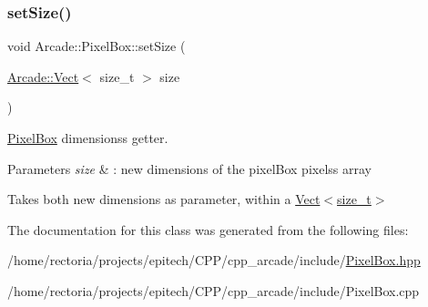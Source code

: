 \subsubsection{\texorpdfstring{set\+Size()}{setSize()}}
{\footnotesize\ttfamily void Arcade\+::\+Pixel\+Box\+::set\+Size (\begin{DoxyParamCaption}\item[{\hyperlink{class_arcade_1_1_vect}{Arcade\+::\+Vect}$<$ size\+\_\+t $>$}]{size }\end{DoxyParamCaption})}



\hyperlink{class_arcade_1_1_pixel_box}{Pixel\+Box} dimensions\textquotesingle{}s getter. 


\begin{DoxyParams}{Parameters}
{\em size} & \+: new dimensions of the pixel\+Box pixels\textquotesingle{}s array\\
\hline
\end{DoxyParams}
Takes both new dimensions as parameter, within a \hyperlink{class_arcade_1_1_vect}{Vect$<$size\+\_\+t$>$} 

The documentation for this class was generated from the following files\+:\begin{DoxyCompactItemize}
\item 
/home/rectoria/projects/epitech/\+C\+P\+P/cpp\+\_\+arcade/include/\hyperlink{_pixel_box_8hpp}{Pixel\+Box.\+hpp}\item 
/home/rectoria/projects/epitech/\+C\+P\+P/cpp\+\_\+arcade/include/Pixel\+Box.\+cpp\end{DoxyCompactItemize}
